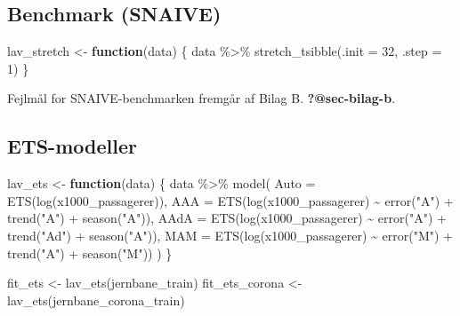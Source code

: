 \documentclass[
  danish,
]{article}
\newenvironment{Shaded}{\begin{snugshade}}{\end{snugshade}}
\newcommand{\AttributeTok}[1]{\textcolor[rgb]{0.40,0.45,0.13}{#1}}
\newcommand{\ControlFlowTok}[1]{\textcolor[rgb]{0.00,0.23,0.31}{\textbf{#1}}}
\newcommand{\DecValTok}[1]{\textcolor[rgb]{0.68,0.00,0.00}{#1}}
\newcommand{\FunctionTok}[1]{\textcolor[rgb]{0.28,0.35,0.67}{#1}}
\newcommand{\NormalTok}[1]{\textcolor[rgb]{0.00,0.23,0.31}{#1}}
\newcommand{\OtherTok}[1]{\textcolor[rgb]{0.00,0.23,0.31}{#1}}
\newcommand{\SpecialCharTok}[1]{\textcolor[rgb]{0.37,0.37,0.37}{#1}}
\newcommand{\StringTok}[1]{\textcolor[rgb]{0.13,0.47,0.30}{#1}}
\begin{document}
\subsection{Benchmark (SNAIVE)}\label{benchmark-snaive}

\begin{Shaded}
\begin{Highlighting}[]
\NormalTok{lav\_stretch }\OtherTok{\textless{}{-}} \ControlFlowTok{function}\NormalTok{(data) \{}
\NormalTok{  data }\SpecialCharTok{\%\textgreater{}\%}
    \FunctionTok{stretch\_tsibble}\NormalTok{(}\AttributeTok{.init =} \DecValTok{32}\NormalTok{, }\AttributeTok{.step =} \DecValTok{1}\NormalTok{)}
\NormalTok{\}}
\end{Highlighting}
\end{Shaded}

Fejlmål for SNAIVE-benchmarken fremgår af Bilag B.
\textbf{?@sec-bilag-b}.

\subsection{ETS-modeller}\label{ets-modeller}

\begin{Shaded}
\begin{Highlighting}[]
\NormalTok{lav\_ets }\OtherTok{\textless{}{-}} \ControlFlowTok{function}\NormalTok{(data) \{}
\NormalTok{  data }\SpecialCharTok{\%\textgreater{}\%}
    \FunctionTok{model}\NormalTok{(}
      \AttributeTok{Auto =} \FunctionTok{ETS}\NormalTok{(}\FunctionTok{log}\NormalTok{(x1000\_passagerer)),}
      \AttributeTok{AAA  =} \FunctionTok{ETS}\NormalTok{(}\FunctionTok{log}\NormalTok{(x1000\_passagerer) }\SpecialCharTok{\textasciitilde{}} \FunctionTok{error}\NormalTok{(}\StringTok{"A"}\NormalTok{) }\SpecialCharTok{+} \FunctionTok{trend}\NormalTok{(}\StringTok{"A"}\NormalTok{)  }\SpecialCharTok{+} \FunctionTok{season}\NormalTok{(}\StringTok{"A"}\NormalTok{)),}
      \AttributeTok{AAdA =} \FunctionTok{ETS}\NormalTok{(}\FunctionTok{log}\NormalTok{(x1000\_passagerer) }\SpecialCharTok{\textasciitilde{}} \FunctionTok{error}\NormalTok{(}\StringTok{"A"}\NormalTok{) }\SpecialCharTok{+} \FunctionTok{trend}\NormalTok{(}\StringTok{"Ad"}\NormalTok{) }\SpecialCharTok{+} \FunctionTok{season}\NormalTok{(}\StringTok{"A"}\NormalTok{)),}
      \AttributeTok{MAM  =} \FunctionTok{ETS}\NormalTok{(}\FunctionTok{log}\NormalTok{(x1000\_passagerer) }\SpecialCharTok{\textasciitilde{}} \FunctionTok{error}\NormalTok{(}\StringTok{"M"}\NormalTok{) }\SpecialCharTok{+} \FunctionTok{trend}\NormalTok{(}\StringTok{"A"}\NormalTok{)  }\SpecialCharTok{+} \FunctionTok{season}\NormalTok{(}\StringTok{"M"}\NormalTok{))}
\NormalTok{    )}
\NormalTok{\}}

\NormalTok{fit\_ets        }\OtherTok{\textless{}{-}} \FunctionTok{lav\_ets}\NormalTok{(jernbane\_train)}
\NormalTok{fit\_ets\_corona }\OtherTok{\textless{}{-}} \FunctionTok{lav\_ets}\NormalTok{(jernbane\_corona\_train)}
\end{Highlighting}
\end{Shaded}
\end{document}
